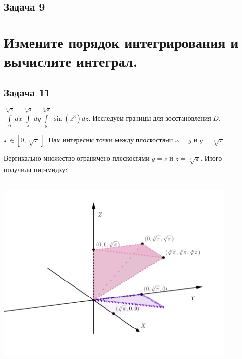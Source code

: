 \documentclass[a4paper, fleqn]{article}
\begin{document}
    
    
    \subsection*{Задача 9}
    
    
    \section*{Измените порядок интегрирования и вычислите интеграл.}
    
    \subsection*{Задача 11}
    
    
    $\displaystyle \int\limits_{0}^{\sqrt[3]{\pi}} dx \int\limits_{x}^{\sqrt[3]{\pi}} dy
    \int\limits_{y}^{\sqrt[3]{\pi}}\sin (z^3) dz.$ Исследуем границы для восстановления $D$.
    
    $x \in [0, \sqrt[3]{\pi}].$ Нам интересны точки между плоскостями $x = y$ и $y = \sqrt[3]{\pi}$. 
    
    Вертикально множество ограничено плоскостями $y = z$ и $z = \sqrt[3]{\pi}.$ Итого получили пирамидку:
    
    \includegraphics[width=12cm, height=10cm]{list24imgs/task 2.4.11.png}        
    
\end{document}
